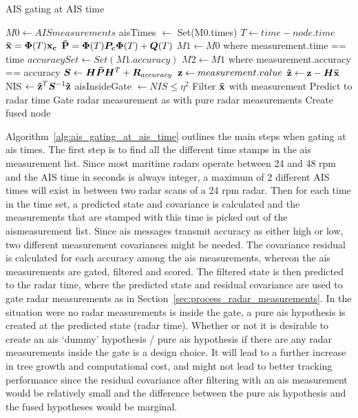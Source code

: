 \begin{algorithm}[H]
\caption{AIS gating at AIS time}\label{alg:ais_gating_at_ais_time}
\begin{algorithmic}[1]
\State{} \(M0 \gets AISmeasurements\)
\State{}  aisTimes \( \gets \) Set(M0.times) 
\State{} \(T \gets time - node.time \)
\State{} \( \boldsymbol{\mathbf{\bar{x}}} = \bm{\Phi}(T) \boldsymbol{\mathbf{x_c}} \)
\State{} \( \boldsymbol{\mathbf{\bar{P}}} = \bm{\Phi}(T) \bm{P_c} \bm{\Phi}(T) + \bm{Q}(T) \)
\State{} \( M1 \gets M0\) where measurement.time  == time
\State{} \( accuracySet \gets Set(M1.accuracy)\) 
\State{} \(M2 \gets M1\) where measurement.accuracy == accuracy
\State{} \( \bm{S} \gets \bm{H}\bm{\bar{P}}\bm{H}^T + \bm{R}_{accuracy} \)
\State{} \( \boldsymbol{\mathbf{z}} \gets measurement.value \)
\State{} \( \boldsymbol{\mathbf{\tilde{z}}} \gets \boldsymbol{\mathbf{z}} - \bm{H} \boldsymbol{\mathbf{\bar{x}}} \)
\State{} NIS \( \gets \boldsymbol{\mathbf{\tilde{z}}}^T \bm{S}^{-1} \boldsymbol{\mathbf{\tilde{z}}} \)
\State{} aisInsideGate \( \gets NIS \leq \eta^2 \)
\State{} Filter \(\boldsymbol{\mathbf{\bar{x}}}\) with measurement
\State{} Predict to radar time
\State{} Gate radar measurement as with pure radar measurements
\State{} Create fused node
\EndFor{}
\EndFor{}
\EndIf{}
\EndFor{}
\EndFor{}
\EndFor{}
\EndProcedure{}
\end{algorithmic}
\end{algorithm}
Algorithm~\ref{alg:ais_gating_at_ais_time} outlines the main steps when gating at \gls{ais} times. The first step is to find all the different time stamps in the \gls{ais} \gls{measurement list}. Since most maritime radars operate between 24 and 48 \gls{rpm} and the AIS time in seconds is always integer, a maximum of 2 different AIS times will exist in between two radar scans of a 24 \gls{rpm} \gls{radar}. Then for each time in the time set, a predicted state and covariance is calculated and the measurements that are stamped with this time is picked out of the \gls{ais}measurement list. Since \gls{ais} messages transmit accuracy as either high or low, two different measurement covariances might be needed. The covariance residual is calculated for each accuracy among the \gls{ais} measurements, whereon the \gls{ais} measurements are gated, filtered and scored. The filtered state is then predicted to the radar time, where the predicted state and residual covariance are used to gate radar measurements as in Section~\ref{sec:process_radar_measurements}. In the situation were no radar measurements is inside the gate, a pure \gls{ais} hypothesis is created at the predicted state (radar time). Whether or not it is desirable to create an \gls{ais} `dummy' hypothesis / pure \gls{ais} hypothesis if there are any radar measurements inside the gate is a design choice. It will lead to a further increase in tree growth and computational cost, and might not lead to better tracking performance since the residual covariance after filtering with an \gls{ais} measurement would be relatively small and the difference between the pure \gls{ais} hypothesis and the fused hypotheses would be marginal.
